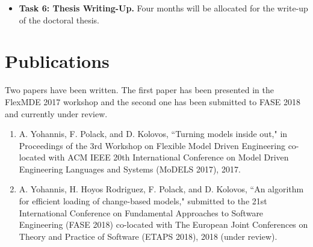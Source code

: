 \documentclass[12pt, a4paper]{report} \usepackage[titletoc]{appendix}
\begin{document}
\begin{itemize}
    \item \textbf{Task 6: Thesis Writing-Up.} Four months will be allocated for the write-up of the doctoral thesis.  
\end{itemize}

\chapter{Publications}
\label{ch:publications}
Two papers have been written. The first paper \cite{yohannis2017turning} has been presented in the FlexMDE 2017 workshop and the second one \cite{yohannis2018algorithm} has been submitted to FASE 2018 and currently under review.
\begin{enumerate}
    \item A. Yohannis, F. Polack, and D. Kolovos, ``Turning models inside out," in Proceedings of the 3rd Workshop on Flexible Model Driven Engineering co-located with ACM IEEE 20th International Conference on Model Driven Engineering Languages and Systems (MoDELS 2017), 2017.
    \item  A. Yohannis, H. Hoyos Rodriguez, F. Polack, and D. Kolovos, ``An algorithm for efficient loading of change-based models," submitted to the 21st International Conference on Fundamental Approaches to Software Engineering (FASE 2018) co-located with The European Joint Conferences on Theory and Practice of Software (ETAPS 2018), 2018 (under review).
\end{enumerate}







\end{document}
